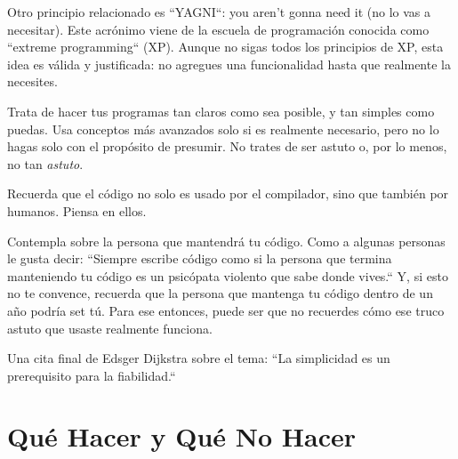 Otro principio relacionado es ``YAGNI``: you aren't gonna need 
it (no lo vas a necesitar). Este acrónimo viene de la escuela 
de programación conocida como ``extreme programming`` (XP).
Aunque no sigas todos los principios de XP, esta idea es
válida y justificada: no agregues una funcionalidad hasta que 
realmente la necesites.

Trata de hacer tus programas tan claros como sea posible,
y tan simples como puedas. Usa conceptos más avanzados solo
si es realmente necesario, pero no lo hagas solo con el propósito
de presumir.  No trates de ser astuto o, por lo menos,
no tan \emph{astuto}.

Recuerda que el código no solo es usado por el compilador,
sino que también por humanos. Piensa en ellos.

Contempla sobre la persona que mantendrá tu código. 
Como a algunas personas le gusta decir: ``Siempre escribe
código como si la persona que termina manteniendo tu código
es un psicópata violento que sabe donde vives.`` Y, si esto no te 
convence, recuerda que la persona que mantenga tu código dentro de
un año podría set tú. Para ese entonces, puede ser que no recuerdes cómo ese
truco astuto que usaste realmente funciona.

Una cita final de Edsger Dijkstra sobre el tema:
``La simplicidad es un prerequisito para la fiabilidad.``

\section{Qué Hacer y Qué No Hacer}

